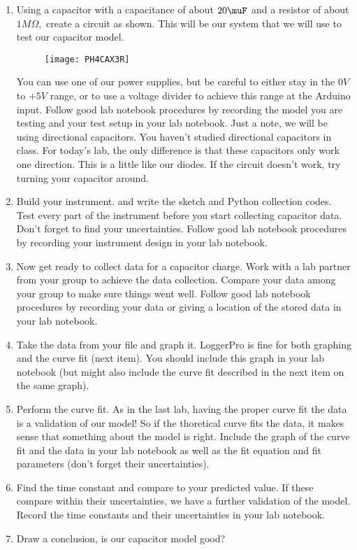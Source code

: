 \begin{enumerate}
\item Using a capacitor with a capacitance of about $20\unit{%
\mu%
F}$ and a resistor of about $1\unit{M%
\Omega%
},$ create a circuit as shown. This will be our system that we will use to
test our capacitor model.\begin{figure}[h!]
\texttt{[image: PH4CAX3R]}
\end{figure}You can use one of our power
supplies, but be careful to either stay in the $0\unit{V}$ to $+5\unit{V}$
range, or to use a voltage divider to achieve this range at the Arduino
input. Follow good lab notebook procedures by recording the model you are
testing and your test setup in your lab notebook. Just a note, we will be
using directional capacitors. You haven't studied directional capacitors in
class. For today's lab, the only difference is that these capacitors only
work one direction. This is a little like our diodes. If the circuit doesn't
work, try turning your capacitor around.

\item Build your instrument. and write the sketch and Python collection
codes. Test every part of the instrument before you start collecting
capacitor data. Don't forget to find your uncertainties. Follow good lab
notebook procedures by recording your instrument design in your lab notebook.

\item Now get ready to collect data for a capacitor charge. Work with a lab
partner from your group to achieve the data collection. Compare your data
among your group to make sure things went well. Follow good lab notebook
procedures by recording your data or giving a location of the stored data in
your lab notebook.

\item Take the data from your file and graph it. LoggerPro is fine for both
graphing and the curve fit (next item). You should include this graph in
your lab notebook (but might also include the curve fit described in the
next item on the same graph).

\item Perform the curve fit. As in the last lab, having the proper curve fit
the data is a validation of our model! So if the thoretical curve fits the
data, it makes sense that something about the model is right. Include the
graph of the curve fit and the data in your lab notebook as well as the fit
equation and fit parameters (don't forget their uncertainties).

\item Find the time constant and compare to your predicted value. If these
compare within their uncertainties, we have a further validation of the
model. Record the time constants and their uncertainties in your lab
notebook.

\item Draw a conclusion, is our capacitor model good?
\end{enumerate}

\vspace*{\fill}%
